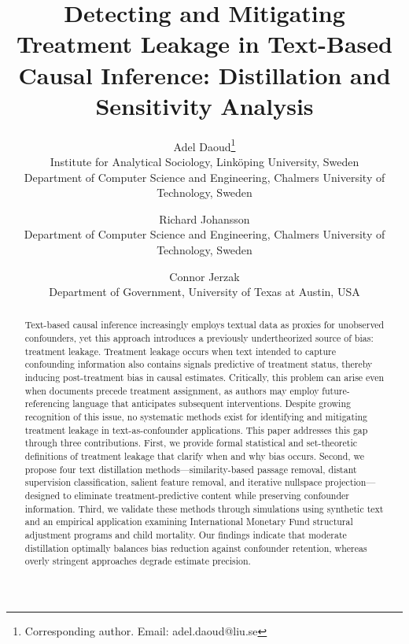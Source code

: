 \documentclass[11pt]{article}
\begin{document}
\title{Detecting and Mitigating Treatment Leakage in Text-Based Causal Inference: Distillation and Sensitivity Analysis}

\author{
  Adel Daoud\thanks{Corresponding author. Email: adel.daoud@liu.se} \\
  Institute for Analytical Sociology, Link\"oping University, Sweden \\
  Department of Computer Science and Engineering, Chalmers University of Technology, Sweden \\
  \and
  Richard Johansson \\
  Department of Computer Science and Engineering, Chalmers University of Technology, Sweden \\
  \and
  Connor Jerzak \\
  Department of Government, University of Texas at Austin, USA
}

\date{}

\maketitle

\begin{abstract}
Text-based causal inference increasingly employs textual data as proxies for unobserved confounders, yet this approach introduces a previously undertheorized source of bias: treatment leakage. Treatment leakage occurs when text intended to capture confounding information also contains signals predictive of treatment status, thereby inducing post-treatment bias in causal estimates. Critically, this problem can arise even when documents precede treatment assignment, as authors may employ future-referencing language that anticipates subsequent interventions. Despite growing recognition of this issue, no systematic methods exist for identifying and mitigating treatment leakage in text-as-confounder applications. This paper addresses this gap through three contributions. First, we provide formal statistical and set-theoretic definitions of treatment leakage that clarify when and why bias occurs. Second, we propose four text distillation methods---similarity-based passage removal, distant supervision classification, salient feature removal, and iterative nullspace projection---designed to eliminate treatment-predictive content while preserving confounder information. Third, we validate these methods through simulations using synthetic text and an empirical application examining International Monetary Fund structural adjustment programs and child mortality. Our findings indicate that moderate distillation optimally balances bias reduction against confounder retention, whereas overly stringent approaches degrade estimate precision.
\end{abstract}
\end{document}

